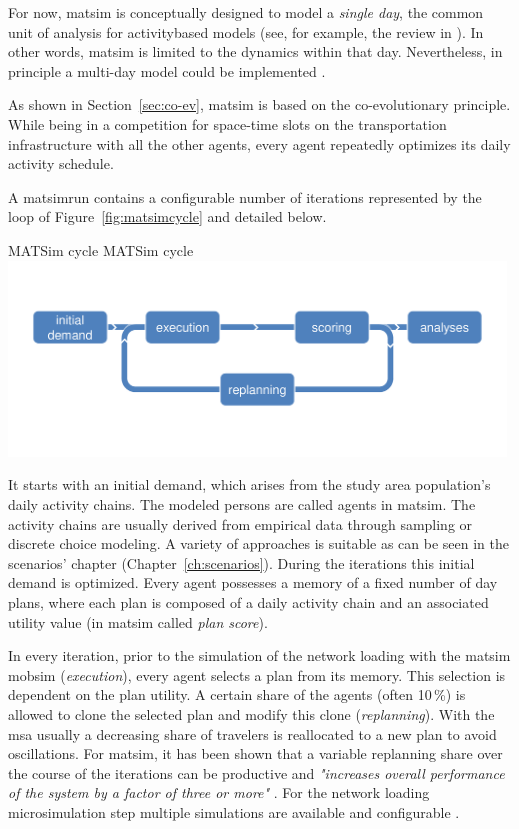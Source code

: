 For now, \gls{matsim} is conceptually designed to model a \emph{single day}, the common unit of analysis for \gls{activitybased} models (see, for example, the review in \citet[][]{Bowman_TEC_2009_1}). In other words, \gls{matsim} is limited to the dynamics within that day. Nevertheless, in principle a multi-day model could be implemented \citep[][]{HorniEtAl_TechRep_IVT_2012_a}.

As shown in Section~\ref{sec:co-ev}, \gls{matsim} is based on the co-evolutionary principle. While being in a competition for space-time slots on the transportation infrastructure with all the other agents, every agent repeatedly optimizes its daily \gls{activity} schedule.

A \gls{matsimrun} contains a configurable number of iterations represented by the loop of Figure~\ref{fig:matsimcycle} and detailed below. 

\createfigure%
{MATSim cycle}%
{MATSim cycle}
{\label{fig:matsimcycle}}%
{\includegraphics[width=0.99\textwidth, angle=0]{figures/matsimcycle.pdf}}%
{}

It starts with an initial demand, which arises from the \gls{study} area population's daily activity chains. The modeled persons are called agents in \gls{matsim}. The activity chains are usually derived from empirical data through sampling or discrete choice modeling. A variety of approaches is suitable as can be seen in the scenarios' chapter (Chapter~\ref{ch:scenarios}). During the iterations this initial demand is optimized. Every agent possesses a memory of a fixed number of day plans, where each \gls{plan} is composed of a daily activity chain and an associated utility value (in \gls{matsim} called \emph{plan \gls{score}}).

In every iteration, prior to the simulation of the network loading with the \gls{matsim} \gls{mobsim} \citep[e.g.,][]{Cetin_PhDThesis_2005} (\emph{execution}), every agent selects a plan from its memory. This selection is dependent on the plan \gls{utility}. A certain share of the agents 
(often 10\,\%) is allowed to clone the selected plan and modify this clone (\emph{\gls{replanning}}). With the \gls{msa} usually a decreasing share of travelers is reallocated to a new plan to avoid oscillations. For \gls{matsim}, it has been shown that a variable replanning share over the course of the iterations can be productive and \emph{"increases overall performance of the system by a factor of three or more"} \citep[][p.7f]{CharyparEtAl_IATBR_2006}. For the network loading microsimulation step multiple simulations are available and configurable \citep[][p.10f]{HorniEtAl_TechRep_IVT_2011_a}. 

